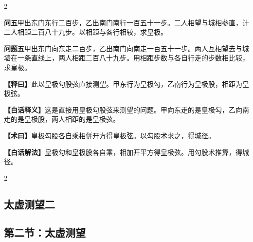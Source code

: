 \documentclass[11pt,a4paper]{article}
\newcommand{\WenQuestion}[1]{\textbf{\textcolor{classicalcolor}{#1}}}
\newcommand{\BaiQuestion}[1]{\textbf{\textcolor{moderncolor}{#1}}}
\newcommand{\WenExplain}{\textcolor{classicalcolor}{\textbf{【释曰】}}}
\newcommand{\BaiExplain}{\textcolor{moderncolor}{\textbf{【白话释义】}}}
\newcommand{\WenMethod}{\textcolor{classicalcolor}{\textbf{【术曰】}}}
\newcommand{\BaiMethod}{\textcolor{moderncolor}{\textbf{【白话解法】}}}
\begin{document}
\begin{paracol}{2}
\vspace{0.8em}

\switchcolumn*
\begin{tcolorbox}[colback=red!3,colframe=red!30!black,boxrule=0.3pt]
\WenQuestion{问五}\quad 甲出东门东行二百步，乙出南门南行一百五十一步。二人相望与城相参直，计二人相距二百八十九步。以相距与各行相较，求皇极。
\end{tcolorbox}
\switchcolumn
\begin{tcolorbox}[colback=blue!3,colframe=blue!30!black,boxrule=0.3pt]
\BaiQuestion{问题五}\quad 甲出东门向东走二百步，乙出南门向南走一百五十一步。两人互相望去与城墙在一条直线上，两人相距二百八十九步。用相距步数与各自行走的步数相比较，求皇极。
\end{tcolorbox}

\switchcolumn*
\begin{tcolorbox}[colback=red!5,colframe=red!30!black,boxrule=0.3pt]
\WenExplain\quad 此以皇极勾股弦直接测望。甲东行为皇极勾，乙南行为皇极股，相距为皇极弦。
\end{tcolorbox}
\switchcolumn
\begin{tcolorbox}[colback=blue!5,colframe=blue!30!black,boxrule=0.3pt]
\BaiExplain\quad 这是直接用皇极勾股弦来测望的问题。甲向东走的是皇极勾，乙向南走的是皇极股，两人相距的是皇极弦。
\end{tcolorbox}

\switchcolumn*
\begin{tcolorbox}[colback=red!5,colframe=red!40!black,boxrule=0.3pt]
\WenMethod\quad 皇极勾股各自乘相併开方得皇极弦。以勾股术求之，得城径。
\end{tcolorbox}
\switchcolumn
\begin{tcolorbox}[colback=blue!5,colframe=blue!40!black,boxrule=0.3pt]
\BaiMethod\quad 皇极勾和皇极股各自乘，相加开平方得皇极弦。用勾股术推算，得城径。
\end{tcolorbox}

\end{paracol}

\vspace{0.5em}

\begin{paracol}{2}
\subsection*{\textcolor{sectioncolor}{太虚测望二}}
\switchcolumn
\subsection*{\textcolor{sectioncolor}{第二节：太虚测望}}
\end{paracol}
\end{document}
